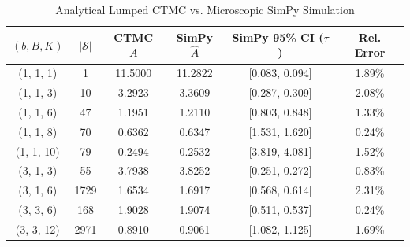 \begin{table}[t]
\centering
\caption{Analytical Lumped CTMC vs. Microscopic SimPy Simulation}
\label{tab:validation_comparison}
\begin{tabular}{cccccc}
\toprule
$(b,B,K)$ & $|\mathcal{S}|$ & \textbf{CTMC $A$} & \textbf{SimPy $\hat{A}$} & \textbf{SimPy 95\% CI ($\tau$)} & \textbf{Rel. Error} \\
\midrule
(1, 1, 1) & 1 & 11.5000 & 11.2822 & [0.083, 0.094] & 1.89\% \\
(1, 1, 3) & 10 & 3.2923 & 3.3609 & [0.287, 0.309] & 2.08\% \\
(1, 1, 6) & 47 & 1.1951 & 1.2110 & [0.803, 0.848] & 1.33\% \\
(1, 1, 8) & 70 & 0.6362 & 0.6347 & [1.531, 1.620] & 0.24\% \\
(1, 1, 10) & 79 & 0.2494 & 0.2532 & [3.819, 4.081] & 1.52\% \\
(3, 1, 3) & 55 & 3.7938 & 3.8252 & [0.251, 0.272] & 0.83\% \\
(3, 1, 6) & 1729 & 1.6534 & 1.6917 & [0.568, 0.614] & 2.31\% \\
(3, 3, 6) & 168 & 1.9028 & 1.9074 & [0.511, 0.537] & 0.24\% \\
(3, 3, 12) & 2971 & 0.8910 & 0.9061 & [1.082, 1.125] & 1.69\% \\
\bottomrule
\end{tabular}
\end{table}
